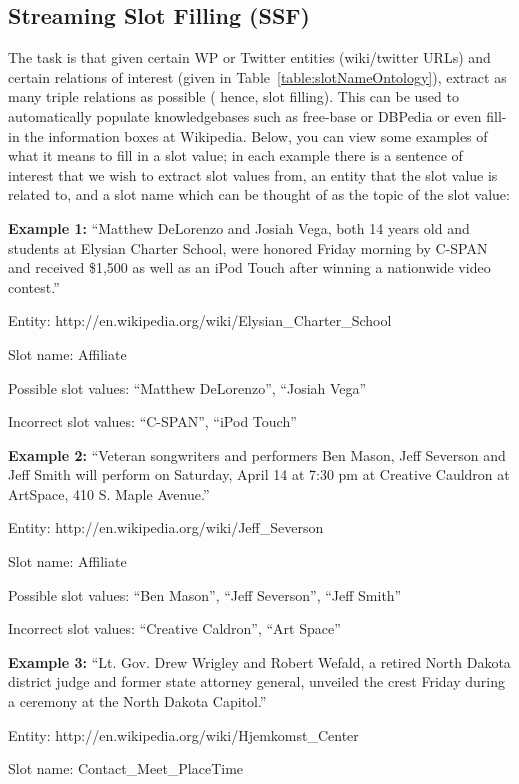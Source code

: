\subsection{Streaming Slot Filling (SSF)}
The task is that given certain WP or Twitter entities 
(wiki/twitter URLs) and certain relations of interest (given in
Table~\ref{table:slotNameOntology}), extract as many triple relations as possible (
hence, slot filling). This can be used to automatically populate knowledgebases 
such as free-base or DBPedia or even fill-in the information boxes at Wikipedia. 
Below, you can view some examples of what it means to fill in a slot value; in 
each example there is a sentence of interest that we wish to extract slot values 
from, an entity that the slot value is related to, and a slot name which can be 
thought of as the topic of the slot value:

\noindent \textbf{Example 1:} ``Matthew DeLorenzo and Josiah Vega, both 14 years old and students 
at Elysian Charter School, were honored Friday morning by C-SPAN and received 
\$1,500 as well as an iPod Touch after winning a nationwide video contest.''

Entity:  http://en.wikipedia.org/wiki/Elysian\_Charter\_School

Slot name: Affiliate

Possible slot values: ``Matthew DeLorenzo'', ``Josiah Vega''

Incorrect slot values: ``C-SPAN'', ``iPod Touch''

\noindent \textbf{Example 2:} ``Veteran songwriters and performers Ben Mason, Jeff Severson and 
Jeff Smith will perform on Saturday, April 14 at 7:30 pm at Creative Cauldron 
at ArtSpace, 410 S. Maple Avenue.''

Entity: http://en.wikipedia.org/wiki/Jeff\_Severson

Slot name: Affiliate

Possible slot values: ``Ben Mason'', ``Jeff Severson'', ``Jeff Smith''

Incorrect slot values: ``Creative Caldron'', ``Art Space''

\noindent \textbf{Example 3:}  ``Lt. Gov. Drew Wrigley and Robert Wefald, a retired North Dakota 
district judge and former state attorney general, unveiled the crest Friday 
during a ceremony at the North Dakota Capitol.''

Entity: http://en.wikipedia.org/wiki/Hjemkomst\_Center

Slot name: Contact\_Meet\_PlaceTime

